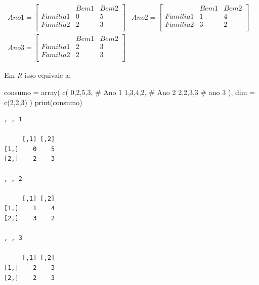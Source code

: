 \documentclass[
  letterpaper,
  DIV=11,
  numbers=noendperiod]{scrreprt}
\newenvironment{Shaded}{\begin{snugshade}}{\end{snugshade}}
\newcommand{\AttributeTok}[1]{\textcolor[rgb]{0.40,0.45,0.13}{#1}}
\newcommand{\CommentTok}[1]{\textcolor[rgb]{0.37,0.37,0.37}{#1}}
\newcommand{\DecValTok}[1]{\textcolor[rgb]{0.68,0.00,0.00}{#1}}
\newcommand{\FunctionTok}[1]{\textcolor[rgb]{0.28,0.35,0.67}{#1}}
\newcommand{\NormalTok}[1]{\textcolor[rgb]{0.00,0.23,0.31}{#1}}
\newcommand{\OtherTok}[1]{\textcolor[rgb]{0.00,0.23,0.31}{#1}}
\begin{document}
\[
\begin{array}{ccc}
Ano 1 = \left[
\begin{array}{c|cc}
& Bem 1 & Bem 2 \\ \hline
Familia 1 & 0 & 5\\
Familia 2 & 2 & 3\\
\end{array}
\right]
&
Ano 2 = \left[
\begin{array}{c|cc}
& Bem 1 & Bem 2 \\ \hline
Familia 1 & 1 & 4\\
Familia 2 & 3 & 2\\
\end{array}
\right]
&\\
Ano 3 = \left[
\begin{array}{c|cc}
& Bem 1 & Bem 2 \\ \hline
Familia 1 & 2 & 3\\
Familia 2 & 2 & 3\\
\end{array}
\right]
\end{array}
\]

Em \emph{R} isso equivale a:

\begin{Shaded}
\begin{Highlighting}[]
\NormalTok{consumo }\OtherTok{=} \FunctionTok{array}\NormalTok{(}
  \FunctionTok{c}\NormalTok{(}
    \DecValTok{0}\NormalTok{,}\DecValTok{2}\NormalTok{,}\DecValTok{5}\NormalTok{,}\DecValTok{3}\NormalTok{, }\CommentTok{\# Ano 1}
    \DecValTok{1}\NormalTok{,}\DecValTok{3}\NormalTok{,}\DecValTok{4}\NormalTok{,}\DecValTok{2}\NormalTok{, }\CommentTok{\# Ano 2}
    \DecValTok{2}\NormalTok{,}\DecValTok{2}\NormalTok{,}\DecValTok{3}\NormalTok{,}\DecValTok{3} \CommentTok{\# ano 3}
\NormalTok{  ),}
  \AttributeTok{dim =} \FunctionTok{c}\NormalTok{(}\DecValTok{2}\NormalTok{,}\DecValTok{2}\NormalTok{,}\DecValTok{3}\NormalTok{)}
\NormalTok{)}
\FunctionTok{print}\NormalTok{(consumo)}
\end{Highlighting}
\end{Shaded}

\begin{verbatim}
, , 1

     [,1] [,2]
[1,]    0    5
[2,]    2    3

, , 2

     [,1] [,2]
[1,]    1    4
[2,]    3    2

, , 3

     [,1] [,2]
[1,]    2    3
[2,]    2    3
\end{verbatim}
\end{document}
